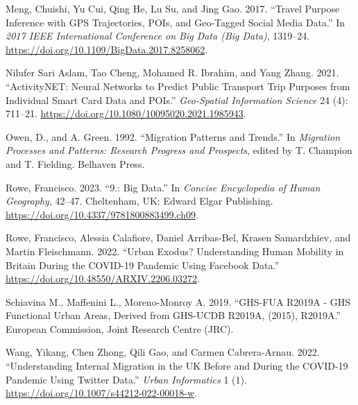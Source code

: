 \documentclass[
  11pt,
]{article}
\newlength{\cslhangindent}
\newenvironment{CSLReferences}[2] %
 {\begin{list}{}{%
  \setlength{\itemindent}{0pt}
  \setlength{\leftmargin}{0pt}
  \setlength{\parsep}{0pt}
  \ifodd #1
   \setlength{\leftmargin}{\cslhangindent}
   \setlength{\itemindent}{-1\cslhangindent}
  \fi
  \setlength{\itemsep}{#2\baselineskip}}}
 {\end{list}}
\begin{document}
\begin{CSLReferences}{1}{0}
Meng, Chuishi, Yu Cui, Qing He, Lu Su, and Jing Gao. 2017. {``Travel
Purpose Inference with GPS Trajectories, POIs, and Geo-Tagged Social
Media Data.''} In \emph{2017 IEEE International Conference on Big Data
(Big Data)}, 1319--24.
\url{https://doi.org/10.1109/BigData.2017.8258062}.

Nilufer Sari Aslam, Tao Cheng, Mohamed R. Ibrahim, and Yang Zhang. 2021.
{``ActivityNET: Neural Networks to Predict Public Transport Trip
Purposes from Individual Smart Card Data and POIs.''} \emph{Geo-Spatial
Information Science} 24 (4): 711--21.
\url{https://doi.org/10.1080/10095020.2021.1985943}.

Owen, D., and A. Green. 1992. {``Migration Patterns and Trends.''} In
\emph{Migration Processes and Patterns: Research Progress and
Prospects}, edited by T. Champion and T. Fielding. Belhaven Press.

Rowe, Francisco. 2023. {``9.: Big Data.''} In \emph{Concise Encyclopedia
of Human Geography}, 42--47. Cheltenham, UK: Edward Elgar Publishing.
\url{https://doi.org/10.4337/9781800883499.ch09}.

Rowe, Francisco, Alessia Calafiore, Daniel Arribas-Bel, Krasen
Samardzhiev, and Martin Fleischmann. 2022. {``Urban Exodus?
Understanding Human Mobility in Britain During the COVID-19 Pandemic
Using Facebook Data.''} \url{https://doi.org/10.48550/ARXIV.2206.03272}.

Schiavina M., Maffenini L., Moreno-Monroy A. 2019. {``GHS-FUA R2019A -
GHS Functional Urban Areas, Derived from GHS-UCDB R2019A, (2015),
R2019A.''} European Commission, Joint Research Centre (JRC).

Wang, Yikang, Chen Zhong, Qili Gao, and Carmen Cabrera-Arnau. 2022.
{``Understanding Internal Migration in the UK Before and During the
COVID-19 Pandemic Using Twitter Data.''} \emph{Urban Informatics} 1 (1).
\url{https://doi.org/10.1007/s44212-022-00018-w}.

\end{CSLReferences}
\end{document}
